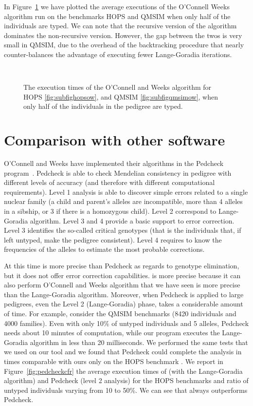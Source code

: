 In Figure~\ref{fig:owtimes} we have plotted the average executions of the
O'Connell Weeks algorithm run on the benchmarks HOPS and QMSIM when only half
of the individuals are typed. We can note that the recursive version of the
algorithm dominates the non-recursive version. However, the gap between the twos
is very small in QMSIM, due to the overhead of the backtracking procedure that
nearly counter-balances the advantage of executing fewer Lange-Goradia
iterations. 

\begin{figure}
  \centering
  \\  
  \caption{The execution times of the O'Connell and Weeks algorithm for HOPS
    \ref{fig:subfighopsow}, and QMSIM \ref{fig:subfigqmsimow}, when only half of
  the individuals in the pedigree are typed.}
  \label{fig:owtimes}
\end{figure}


\section{Comparison with other software}
\label{sec:comp-with-other}
O'Connell and Weeks have implemented their algorithms in the Pedcheck
program~\cite{pedcheck}. Pedcheck is able to check Mendelian consistency in
pedigree with different levels of accuracy (and therefore with different
computational requirements). Level 1 analysis is able to discover simple errors
related to a single nuclear family (a child and parent's alleles are
incompatible, more than 4 alleles in a sibship, or 3 if there is a homozygous
child). Level 2 correspond to Lange-Goradia algorithm. Level 3 and 4 provide a
basic support to error correction. Level 3 identifies the so-called critical
genotypes (that is the individuals that, if left untyped, make the pedigree
consistent). Level 4 requires to know the frequencies of the alleles to estimate
the most probable corrections. 

At this time {\TheTool} is more precise than Pedcheck as regards to
genotype elimination, but it does not offer error correction capabilities. 
{\TheTool} is more precise because it can also perform O'Connell and Weeks
algorithm that we have seen is more precise than the Lange-Goradia algorithm.
Moreover, when Pedcheck is applied to large pedigrees, even the Level 2
(Lange-Goradia) phase, takes a considerable amount of time. For example,
consider the QMSIM benchmarks (8420 individuals and 4000 families). Even with
only 10\% of untyped individuals and 5 alleles, Pedcheck needs about 10 minutes
of computation, while our program executes the Lange-Goradia algorithm in less
than 20 milliseconds. We performed the same tests that we used on our tool and
we found that Pedcheck could complete the analysis in times comparable with ours
only on the HOPS benchmark . We report in Figure~\ref{fig:pedcheckcfr} the
average execution times of {} (with the Lange-Goradia algorithm) and
Pedcheck (level 2 analysis) for the HOPS benchmarks and ratio of untyped
individuals varying from 10 to 50\%. We can see that {} always
outperforms Pedcheck.

